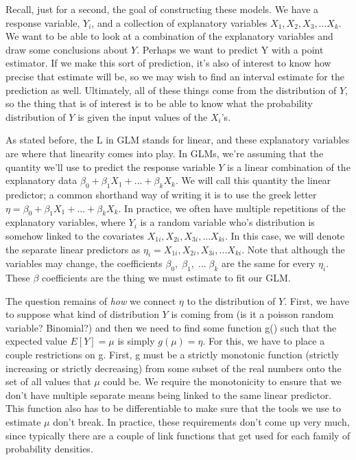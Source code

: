 \documentclass[
]{book}
\begin{document}
Recall, just for a second, the goal of constructing these models. We have a response variable, \(Y_i\), and a collection of explanatory variables \(X_1, X_2, X_3,...X_k\). We want to be able to look at a combination of the explanatory variables and draw some conclusions about \(Y\). Perhaps we want to predict Y with a point estimator. If we make this sort of prediction, it's also of interest to know how precise that estimate will be, so we may wish to find an interval estimate for the prediction as well. Ultimately, all of these things come from the distribution of \(Y\), so the thing that is of interest is to be able to know what the probability distribution of \(Y\) is given the input values of the \(X_i\)'s.

As stated before, the L in GLM stands for linear, and these explanatory variables are where that linearity comes into play. In GLMs, we're assuming that the quantity we'll use to predict the response variable \(Y\) is a linear combination of the explanatory data \(\beta_0+\beta_1X_{1}+...+\beta_kX_{k}\). We will call this quantity the linear predictor; a common shorthand way of writing it is to use the greek letter \(\eta = \beta_0+\beta_1X_{1}+...+\beta_kX_{k}\). In practice, we often have multiple repetitions of the explanatory variables, where \(Y_i\) is a random variable who's distribution is somehow linked to the covariates \(X_{1i}, X_{2i}, X_{3i},...X_{ki}\). In this case, we will denote the separate linear predictors as \(\eta_i = X_{1i}, X_{2i}, X_{3i},...X_{ki}\). Note that although the variables may change, the coefficients \(\beta_0, \; \beta_1, \; ... \; \beta_k\) are the same for every \(\eta_i\). These \(\beta\) coefficients are the thing we must estimate to fit our GLM.

The question remains of \emph{how} we connect \(\eta\) to the distribution of \(Y\). First, we have to suppose what kind of distribution \(Y\) is coming from (is it a poisson random variable? Binomial?) and then we need to find some function g() such that the expected value \(E[Y] = \mu\) is simply \(g(\mu) = \eta\). For this, we have to place a couple restrictions on g. First, g must be a strictly monotonic function (strictly increasing or strictly decreasing) from some subset of the real numbers onto the set of all values that \(\mu\) could be. We require the monotonicity to ensure that we don't have multiple separate means being linked to the same linear predictor. This function also has to be differentiable to make sure that the tools we use to estimate \(\mu\) don't break. In practice, these requirements don't come up very much, since typically there are a couple of link functions that get used for each family of probability densities.
\end{document}
